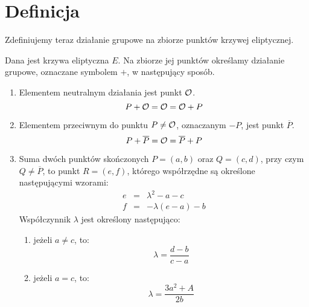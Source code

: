 \section{Definicja}

Zdefiniujemy teraz działanie grupowe na zbiorze punktów krzywej eliptycznej.

\begin{definition}\label{ec_groupop_def}
Dana jest krzywa eliptyczna $E$.
Na zbiorze jej punktów określamy działanie grupowe,
oznaczane symbolem $+$,
w następujący sposób.
\begin{enumerate}

\item\label{ec_groupop_neutral}
Elementem neutralnym działania jest punkt $\mathcal{O}$.
\begin{equation}
P + \mathcal{O} = \mathcal{O} = \mathcal{O} + P
\end{equation}
\item\label{ec_groupop_inverse}
Elementem przeciwnym do punktu $P \neq \mathcal{O}$,
oznaczanym $-P$,
jest punkt $\overline{P}$.
\begin{equation}
P + \overline{P} = \mathcal{O} = \overline{P} + P
\end{equation}
\item\label{ec_groupop_add_generic}
Suma dwóch punktów skończonych $P = (a, b)$ oraz $Q = (c, d)$,
przy czym $Q \neq \overline{P}$, to punkt $R = (e, f)$,
którego współrzędne są określone następującymi wzorami:
\begin{eqnarray}\label{ec_groupop_add_generic_eqn}
e & = & \lambda^2 - a - c \\
f & = & -\lambda(e - a) - b
\end{eqnarray}
Współczynnik $\lambda$ jest określony następująco:
\begin{enumerate}
\item\label{ec_groupop_add_generic_chord}
jeżeli $a \neq c$, to:
\begin{equation}\label{ec_groupop_add_generic_lambda_chord_eqn}
\lambda = \frac{d-b}{c-a}
\end{equation}
\item\label{ec_groupop_add_generic_tangent}
jeżeli $a = c$, to:
\begin{equation}\label{ec_groupop_add_generic_lambda_tangent_eqn}
\lambda = \frac{3a^2+A}{2b}
\end{equation}
\end{enumerate}
\end{enumerate}
\end{definition}

